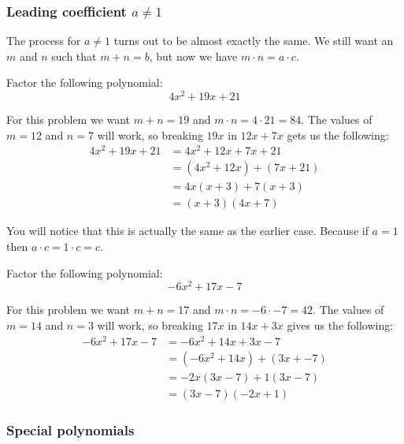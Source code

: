 \ifprintanswers
\newpage
\fi
\subsubsection*{Leading coefficient $a\neq1$}

The process for $a\neq1$ turns out to be almost exactly the same. We still
want an $m$ and $n$ such that $m+n=b$, but now we have $m\cdot n=a\cdot c$.

\begin{exercise}
Factor the following polynomial:
\[
4x^2+19x+21
\]
\end{exercise}
\begin{solution}[3in]
For this problem we want $m+n=19$ and $m\cdot n=4\cdot21=84$. The values of
$m=12$ and $n=7$ will work, so breaking $19x$ in $12x+7x$ gets us the following:
\begin{align*}
4x^2+19x+21&=4x^2+12x+7x+21\\
&=(4x^2+12x)+(7x+21)\\
&=4x(x+3)+7(x+3)\\
&=(x+3)(4x+7)
\end{align*}
\end{solution}
\vspace{0.5em}
\ifprintanswers
\begin{note}
You will notice that this is actually the same as the earlier case. Because
if $a=1$ then $a\cdot c=1\cdot c=c$.
\end{note}
\fi

\begin{exercise}
Factor the following polynomial:
\[
-6x^2+17x-7
\]
\end{exercise}
\begin{solution}[3in]
For this problem we want $m+n=17$ and $m\cdot n=-6\cdot-7=42$. The values of
$m=14$ and $n=3$ will work, so breaking $17x$ in $14x+3x$ gives us the following:
\begin{align*}
-6x^2+17x-7&=-6x^2+14x+3x-7\\
&=(-6x^2+14x)+(3x+-7)\\
&=-2x(3x-7)+1(3x-7)\\
&=(3x-7)(-2x+1)
\end{align*}
\end{solution}
\vspace{0.5em}

\subsubsection{Special polynomials}

